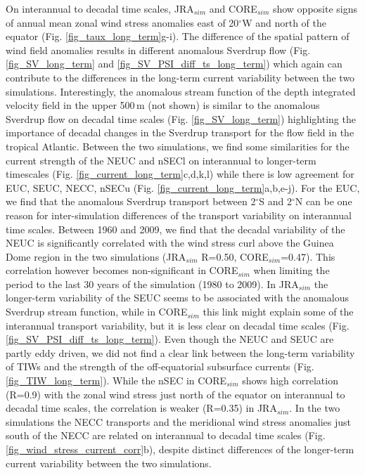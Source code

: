 \documentclass[os, manuscript]{copernicus}
\begin{document}
	
	On interannual to decadal time scales, JRA$_{sim}$ and CORE$_{sim}$ show opposite signs of annual mean zonal wind stress anomalies east of 20$^{\circ}$W and north of the equator (Fig. \ref{fig_taux_long_term}g-i). The difference of the spatial pattern of wind field anomalies results in different anomalous Sverdrup flow (Fig. \ref{fig_SV_long_term} and \ref{fig_SV_PSI_diff_ts_long_term}) which again can contribute to the differences in the long-term current variability between the two simulations. Interestingly, the anomalous stream function of the depth integrated velocity field in the upper 500$\,$m (not shown) is similar to the anomalous Sverdrup flow on decadal time scales (Fig. \ref{fig_SV_long_term}) highlighting the importance of decadal changes in the Sverdrup transport for the flow field in the tropical Atlantic. Between the two simulations, we find some similarities for the current strength of the NEUC and nSECl on interannual to longer-term timescales (Fig. \ref{fig_current_long_term}c,d,k,l) while there is low agreement for EUC, SEUC, NECC, nSECu (Fig. \ref{fig_current_long_term}a,b,e-j). For the EUC, we find that the anomalous Sverdrup transport between 2$^{\circ}$S and 2$^{\circ}$N can be one reason for inter-simulation differences of the transport variability on interannual time scales. Between 1960 and 2009, we find that the decadal variability of the NEUC is significantly correlated with the wind stress curl above the Guinea Dome region in the two simulations (JRA$_{sim}$ R=0.50, CORE$_{sim}$=0.47). This correlation however becomes non-significant in CORE$_{sim}$ when limiting the period to the last 30 years of the simulation (1980 to 2009). In JRA$_{sim}$ the longer-term variability of the SEUC seems to be associated with the anomalous Sverdrup stream function, while in CORE$_{sim}$ this link might explain some of the interannual transport variability, but it is less clear on decadal time scales (Fig. \ref{fig_SV_PSI_diff_ts_long_term}). Even though the NEUC and SEUC are partly eddy driven, we did not find a clear link between the long-term variability of TIWs and the strength of the off-equatorial subsurface currents (Fig. \ref{fig_TIW_long_term}). While the nSEC in CORE$_{sim}$ shows high correlation (R=0.9) with the zonal wind stress just north of the equator on interannual to decadal time scales, the correlation is weaker (R=0.35) in JRA$_{sim}$. In the two simulations the NECC transports and the meridional wind stress anomalies just south of the NECC are related on interannual to decadal time scales (Fig. \ref{fig_wind_stress_current_corr}b), despite distinct differences of the longer-term current variability between the two simulations.
	
\end{document}
